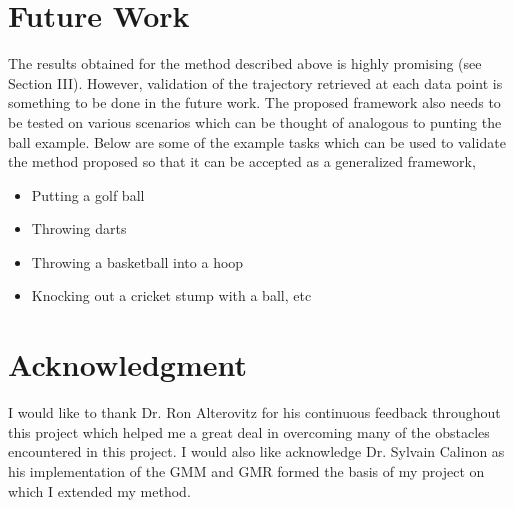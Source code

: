 \documentclass[conference]{IEEEtran}
\begin{document}
\section{Future Work}
The results obtained for the method described above is highly promising (see Section III). However, validation of the trajectory retrieved at each data point is something to be done in the future work. The proposed framework also needs to be tested on various scenarios which can be thought of analogous to punting the ball example. Below are some of the example tasks which can be used to validate the method proposed so that it can be accepted as a generalized framework,

\begin{itemize}
\item{
    Putting a golf ball
}    
\item{
    Throwing darts
}    
\item{
    Throwing a basketball into a hoop
}    
\item{
    Knocking out a cricket stump with a ball, etc
}
\end{itemize}

\section*{Acknowledgment}
I would like to thank Dr. Ron Alterovitz for his continuous feedback throughout this project which helped me a great deal in overcoming many of the obstacles encountered in this project. I would also like acknowledge Dr. Sylvain Calinon as his implementation of the GMM and GMR formed the basis of my project on which I extended my method.
\end{document}
